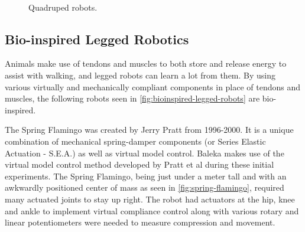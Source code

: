 \begin{figure}
\centering
{}
~

\caption{Quadruped robots.}
\label{fig:Quadruped-robots}
\end{figure}


\subsection{Bio-inspired Legged Robotics}

Animals make use of tendons and muscles to both store and release energy to assist with walking, and legged robots can learn a lot from them. By using various virtually and mechanically compliant components in place of tendons and muscles, the following robots seen in \cref{fig:bioinspired-legged-robots} are bio-inspired.

The Spring Flamingo was created by Jerry Pratt from 1996-2000.\cite{Pratt1998} It is a unique combination of mechanical spring-damper components (or Series Elastic Actuation - S.E.A.) as well as virtual model control.\cite{Pratt1998} Baleka makes use of the virtual model control method developed by Pratt et al during these initial experiments. The Spring Flamingo, being just under a meter tall and with an awkwardly positioned center of mass as seen in \cref{fig:spring-flamingo}, required many actuated joints to stay up right. The robot had actuators at the hip, knee and ankle to implement virtual compliance control along with various rotary and linear potentiometers were needed to measure compression and movement.\cite{Pratt1998}

